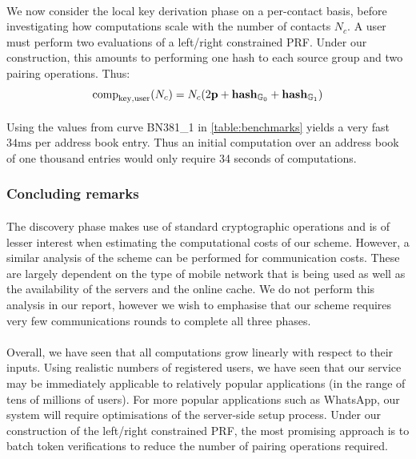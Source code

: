 	\paragraph{} We now consider the local key derivation phase on a per-contact basis, before investigating how computations scale with the number of contacts $N_c$. A user must perform two evaluations of a left/right constrained PRF. Under our construction, this amounts to performing one hash to each source group and two pairing operations. Thus:
	\begin{equation}
		\mathrm{comp}_{\mathrm{key, user}}(N_c) = N_c(2\mathbf{p} + \mathbf{hash}_{\mathbb{G}_0} + \mathbf{hash}_{\mathbb{G}_1})
	\end{equation}

	\paragraph{} Using the values from curve BN381\_1 in \autoref{table:benchmarks} yields  a very fast $34\mathrm{ms}$ per address book entry. Thus an initial computation over an address book of one thousand entries would only require 34 seconds of computations.
	
	\subsubsection{Concluding remarks}
	
	\paragraph{} The discovery phase makes use of standard cryptographic operations and is of lesser interest when estimating the computational costs of our scheme. However, a similar analysis of the scheme can be performed for communication costs. These are largely dependent on the type of mobile network that is being used as well as the availability of the servers and the online cache. We do not perform this analysis in our report, however we wish to emphasise that our scheme requires very few communications rounds to complete all three phases.
	
	
	\paragraph{} Overall, we have seen that all computations grow linearly with respect to their inputs. Using realistic numbers of registered users, we have seen that our service may be immediately applicable to relatively popular applications (in the range of tens of millions of users). For more popular applications such as WhatsApp, our system will require optimisations of the server-side setup process. Under our construction of the left/right constrained PRF, the most promising approach is to batch token verifications to reduce the number of pairing operations required. 
	
